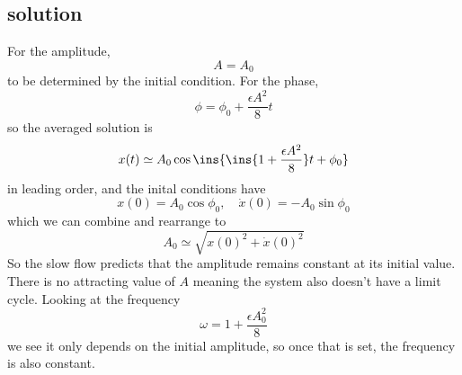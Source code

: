 \subsection{solution}
For the amplitude, 
\begin{equation}
    A = A_0
\end{equation}
to be determined by the initial condition. For the phase,
\begin{equation}
    \phi=\phi_0+\frac{\epsilon A^2}{8}t
\end{equation}
so the averaged solution is 
\begin{equation}
    x(t)\simeq A_0\cos\ins{\ins{1+\frac{\epsilon A^2}{8}}t+\phi_0}
\end{equation}
in leading order, and the inital conditions have 
\begin{equation}
    x(0) = A_0\cos\phi_0,\quad\dot{x}(0)=-A_0\sin\phi_0
\end{equation}
which we can combine and rearrange to
\begin{equation}
    A_0 \simeq \sqrt{x(0)^2+\dot{x}(0)^2}
\end{equation}
So the slow flow predicts that the amplitude remains constant at its initial value. There is no attracting value of \(A\) meaning the system also doesn't have a limit cycle. Looking at the frequency 
\begin{equation}
    \omega = 1+\frac{\epsilon A_0^2}{8}
\end{equation}
we see it only depends on the initial amplitude, so once that is set, the frequency is also constant.